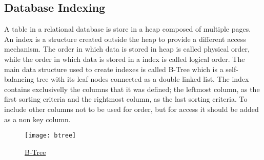 \documentclass[../../main.tex]{subfiles}
\begin{document}
\subsection{Database Indexing}
A table in a relational database is store in a heap composed of multiple pages.
An index is a structure created outside the heap to provide a different access mechanism.
The order in which data is stored in heap is called physical order, while the order in
which data is stored in a index is called logical order. The main data structure used to
create indexes is called B-Tree which is a self-balancing tree with its leaf nodes
connected as a double linked list. The index contains exclusivelly the columns that it
was defined; the leftmost column, as the first sorting criteria and the rightmost
column, as the last sorting criteria. To include other columns not to be used for order,
but for access it should be added as a non key column.
\begin{figure}
    \centering
    \texttt{[image: btree]}
    \caption{\href{https://use-the-index-luke.com/sql/where-clause/the-equals-operator/concatenated-keys}{B-Tree}}
\end{figure}
\end{document}
